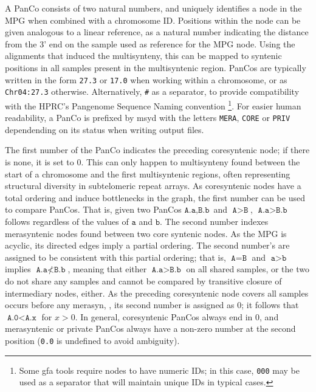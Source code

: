 A PanCo consists of two natural numbers, and uniquely identifies a node in the MPG when combined with a chromosome ID.
Positions within the node can be given analogous to a linear reference, as a natural number indicating the distance from the 3' end on the sample used as reference for the MPG node.
Using the alignments that induced the multisynteny, this can be mapped to syntenic positions in all samples present in the multisyntenic region.
PanCos are typically written in the form \texttt{27.3} or \texttt{17.0} when working within a chromosome, or as \texttt{Chr04:27.3} otherwise.
Alternatively, \texttt{\#} as a separator, to provide compatibility with the HPRC's Pangenome Sequence Naming convention
\footnote{Some gfa tools require nodes to have numeric IDs; in this case, \texttt{000} may be used as a separator that will maintain unique IDs in typical cases.}\cite{pansn}.
For easier human readability, a PanCo is prefixed by msyd with the letters \texttt{MERA}, \texttt{CORE} or \texttt{PRIV} dependending on its status when writing output files.

The first number of the PanCo indicates the preceding coresyntenic node; if there is none, it is set to 0.
This can only happen to multisynteny found between the start of a chromosome and the first multisyntenic regions, often representing structural diversity in subtelomeric repeat arrays.
As coresyntenic nodes have a total ordering and induce bottlenecks in the graph, the first number can be used to compare PanCos.
That is, given two PanCos $\texttt{A.a}, \texttt{B.b}$ and $\texttt{A} > \texttt{B}$, $\texttt{A.a} > \texttt{B.b}$ follows regardless of the values of $\texttt{a}$ and $\texttt{b}$.
The second number indexes merasyntenic nodes found between two core syntenic nodes.
As the MPG is acyclic, its directed edges imply a partial ordering.
The second number's are assigned to be consistent with this partial ordering; that is, $\texttt{A}=\texttt{B}$ and $\texttt{a} > \texttt{b}$ implies $\texttt{A.a} \nless \texttt{B.b}$, meaning that either $\texttt{A.a} > \texttt{B.b}$ on all shared samples, or the two do not share any samples and cannot be compared by transitive closure of intermediary nodes, either.
As the preceding coresyntenic node covers all samples occurs before any merasyn, , its second number is assigned as $0$; it follows that $\texttt{A.0} < \texttt{A.x}$ for $x > 0$. %
In general, coresyntenic PanCos always end in $0$, and merasyntenic or private PanCos always have a non-zero number at the second position (\texttt{0.0} is undefined to avoid ambiguity).

